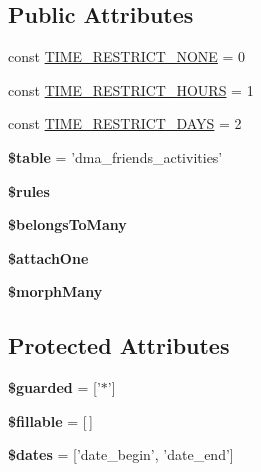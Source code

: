 \subsection*{Public Attributes}
\begin{DoxyCompactItemize}
\item 
const \hyperlink{classDMA_1_1Friends_1_1Models_1_1Activity_ab9dd8b18c4810beabdcf8e45039913c8}{T\-I\-M\-E\-\_\-\-R\-E\-S\-T\-R\-I\-C\-T\-\_\-\-N\-O\-N\-E} = 0
\item 
const \hyperlink{classDMA_1_1Friends_1_1Models_1_1Activity_ac78040e8784e02c2d1bcce5221ac6cb8}{T\-I\-M\-E\-\_\-\-R\-E\-S\-T\-R\-I\-C\-T\-\_\-\-H\-O\-U\-R\-S} = 1
\item 
const \hyperlink{classDMA_1_1Friends_1_1Models_1_1Activity_a71b85478f20cda144aeffe010364a0f7}{T\-I\-M\-E\-\_\-\-R\-E\-S\-T\-R\-I\-C\-T\-\_\-\-D\-A\-Y\-S} = 2
\item 
\hypertarget{classDMA_1_1Friends_1_1Models_1_1Activity_a2ded517047c73d831aef535c8adc6690}{{\bfseries \$table} = 'dma\-\_\-friends\-\_\-activities'}\label{classDMA_1_1Friends_1_1Models_1_1Activity_a2ded517047c73d831aef535c8adc6690}

\item 
{\bfseries \$rules}
\item 
{\bfseries \$belongs\-To\-Many}
\item 
{\bfseries \$attach\-One}
\item 
{\bfseries \$morph\-Many}
\end{DoxyCompactItemize}
\subsection*{Protected Attributes}
\begin{DoxyCompactItemize}
\item 
\hypertarget{classDMA_1_1Friends_1_1Models_1_1Activity_ac82a10f722788b5c1c7a5295e1ac10c2}{{\bfseries \$guarded} = \mbox{[}'$\ast$'\mbox{]}}\label{classDMA_1_1Friends_1_1Models_1_1Activity_ac82a10f722788b5c1c7a5295e1ac10c2}

\item 
\hypertarget{classDMA_1_1Friends_1_1Models_1_1Activity_ab2a7401215dff9dfd8b600247b12454a}{{\bfseries \$fillable} = \mbox{[}$\,$\mbox{]}}\label{classDMA_1_1Friends_1_1Models_1_1Activity_ab2a7401215dff9dfd8b600247b12454a}

\item 
\hypertarget{classDMA_1_1Friends_1_1Models_1_1Activity_afe94503fbf177345e4bf0b1625dee499}{{\bfseries \$dates} = \mbox{[}'date\-\_\-begin', 'date\-\_\-end'\mbox{]}}\label{classDMA_1_1Friends_1_1Models_1_1Activity_afe94503fbf177345e4bf0b1625dee499}

\end{DoxyCompactItemize}


